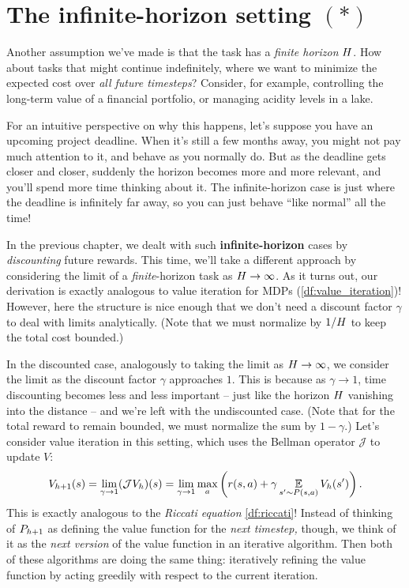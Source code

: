 \documentclass[\main/main]{subfiles}
\begin{document}

\iffalse
    \section{The infinite-horizon setting $(*)$}

    Another assumption we've made is that the task has a \emph{finite horizon} $H$. How about tasks that might continue indefinitely, where we want to minimize the expected cost over \emph{all future timesteps}? Consider, for example, controlling the long-term value of a financial portfolio, or managing acidity levels in a lake.

    For an intuitive perspective on why this happens, let's suppose you have an upcoming project deadline. When it's still a few months away, you might not pay
    much attention to it, and behave as you normally do. But as the deadline gets closer and closer, suddenly the
    horizon becomes more and more relevant, and you'll spend more time thinking about it.
    The infinite-horizon case is just where the deadline is infinitely far away, so you can just behave ``like normal'' all the time!

    In the previous chapter, we dealt with such \textbf{infinite-horizon} cases by \emph{discounting} future rewards. This time, we'll take a different approach by considering the limit of a \emph{finite}-horizon task as $H \to \infty$.
    As it turns out, our derivation is exactly analogous to value iteration for MDPs (\autoref{df:value_iteration})!
    However, here the structure is nice enough that we don't need a discount factor $\gamma$ to deal with limits analytically.
    (Note that we must normalize by $1/H$ to keep the total cost bounded.)

    In the discounted case, analogously to taking the limit as $H \to \infty$, we consider the limit as the discount factor $\gamma$ approaches $1$. This is because as $\gamma \to 1$, time discounting becomes less and less important -- just like the horizon $H$ vanishing into the distance -- and we're left with the undiscounted case. (Note that for the total reward to remain bounded, we must normalize the sum by $1 - \gamma$.) Let's consider value iteration in this setting, which uses the Bellman operator $\mathcal{J}$ to update $V$: \[
        V_{h+1}(s) = \lim_{\gamma \to 1} (\mathcal{J} V_h)(s) = \lim_{\gamma \to 1} \max_a \left( r(s, a) + \gamma \operatorname*{\mathbb{E}}_{s' \sim P(s, a)} V_h(s') \right).
    \]
    This is exactly analogous to the \emph{Riccati equation} \eqref{df:riccati}!
    Instead of thinking of $P_{h+1}$ as defining the value function for the \emph{next timestep,} though, we think of it as the \emph{next version} of the value function in an iterative algorithm.
    Then both of these algorithms are doing the same thing:
    iteratively refining the value function by acting greedily with respect to the current iteration.
\end{document}
